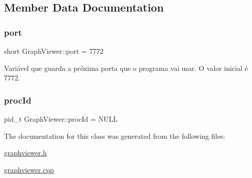 \subsection{Member Data Documentation}
\hypertarget{class_graph_viewer_a89d0abe75f41feededc49497cc514342}{}\label{class_graph_viewer_a89d0abe75f41feededc49497cc514342} 
\subsubsection{\texorpdfstring{port}{port}}
{\footnotesize\ttfamily short Graph\+Viewer\+::port = 7772\hspace{0.3cm}{\ttfamily [static]}}

Variável que guarda a próxima porta que o programa vai usar. O valor inicial é 7772. \hypertarget{class_graph_viewer_aeab74c57a4b672384f484884c000c692}{}\label{class_graph_viewer_aeab74c57a4b672384f484884c000c692} 
\subsubsection{\texorpdfstring{proc\+Id}{procId}}
{\footnotesize\ttfamily pid\+\_\+t Graph\+Viewer\+::proc\+Id = N\+U\+LL\hspace{0.3cm}{\ttfamily [static]}}



The documentation for this class was generated from the following files\+:\begin{DoxyCompactItemize}
\item 
\hyperlink{graphviewer_8h}{graphviewer.\+h}\item 
\hyperlink{graphviewer_8cpp}{graphviewer.\+cpp}\end{DoxyCompactItemize}
